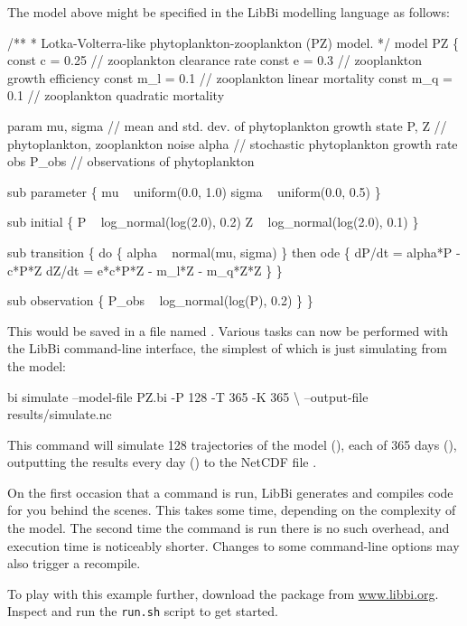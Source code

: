 The model above might be specified in the LibBi modelling language as follows:
\begin{bicode}
/**
 * Lotka-Volterra-like phytoplankton-zooplankton (PZ) model.
 */
model PZ \{
  const c = 0.25   // zooplankton clearance rate
  const e = 0.3    // zooplankton growth efficiency
  const m_l = 0.1  // zooplankton linear mortality
  const m_q = 0.1  // zooplankton quadratic mortality

  param mu, sigma  // mean and std. dev. of phytoplankton growth
  state P, Z       // phytoplankton, zooplankton
  noise alpha      // stochastic phytoplankton growth rate
  obs P_obs        // observations of phytoplankton
  
  sub parameter \{
    mu ~ uniform(0.0, 1.0)
    sigma ~ uniform(0.0, 0.5)
  \}
  
  sub initial \{
    P ~ log_normal(log(2.0), 0.2)
    Z ~ log_normal(log(2.0), 0.1)
  \}

  sub transition \{
    do \{
      alpha ~ normal(mu, sigma)
    \} then ode \{
      dP/dt = alpha*P - c*P*Z
      dZ/dt = e*c*P*Z - m_l*Z - m_q*Z*Z
    \}
  \}

  sub observation \{
    P_obs ~ log_normal(log(P), 0.2)
  \}
\}
\end{bicode}

This would be saved in a file named . Various tasks can now be
performed with the LibBi command-line interface, the simplest of which is
just simulating from the model:
\begin{cmdcode}
bi simulate --model-file PZ.bi -P 128 -T 365 -K 365 \textbackslash
    --output-file results/simulate.nc
\end{cmdcode}
This command will simulate 128 trajectories of the model (), each
of 365 days (), outputting the results every day ()
to the NetCDF file .

\begin{tip}
On the first occasion that a command is run, LibBi generates and compiles code
for you behind the scenes. This takes some time, depending on the complexity
of the model. The second time the command is run there is no such overhead,
and execution time is noticeably shorter. Changes to some command-line options
may also trigger a recompile.
\end{tip}

To play with this example further, download the  package from
\url{www.libbi.org}. Inspect and run the \texttt{run.sh} script to get
started.

